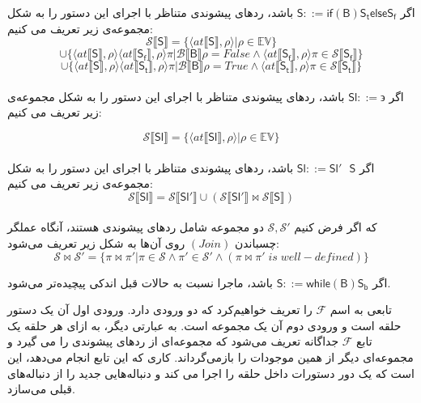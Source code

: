 \begin{defn}
	
	اگر $         \mathsf{S} ::= \mathsf{if}  \mathsf{ (B) S_t else S_f}  $ باشد، ردهای پیشوندی متناظر با اجرای این دستور را به شکل مجموعه‌ی زیر تعریف می کنیم:
	$$\mathcal{S} \llbracket\mathsf{S}\rrbracket = \{ \langle at\llbracket\mathsf{S}\rrbracket , \rho \rangle | \rho \in \mathbb{EV}       \} $$$$\cup     \{ \langle at\llbracket\mathsf{S}\rrbracket , \rho \rangle \langle at\llbracket\mathsf{S_f}\rrbracket , \rho \rangle 
	\pi | \mathcal{B}\llbracket\mathsf{B}\rrbracket \rho =False  \wedge   \langle  at\llbracket\mathsf{S_f}\rrbracket  , \rho \rangle \pi \in \mathcal{S} \llbracket\mathsf{S_f}\rrbracket    \}  
	$$$$\cup    \{ \langle at\llbracket\mathsf{S}\rrbracket , \rho \rangle \langle at\llbracket\mathsf{S_t}\rrbracket , \rho \rangle 
	\pi | \mathcal{B}\llbracket\mathsf{B}\rrbracket \rho =True  \wedge   \langle  at\llbracket\mathsf{S_t}\rrbracket  , \rho \rangle \pi \in \mathcal{S} \llbracket\mathsf{S_t}\rrbracket    \}          $$ \\
	
	
	اگر 
	$         \mathsf{Sl} ::= \backepsilon  $
	باشد، ردهای پیشوندی متناظر با اجرای این دستور را به شکل مجموعه‌ی زیر تعریف می کنیم:
	
	$$\mathcal{S} \llbracket\mathsf{Sl}\rrbracket = \{ \langle at\llbracket\mathsf{Sl}\rrbracket , \rho \rangle | \rho \in \mathbb{EV}       \}        $$ \\
	
	اگر $         \mathsf{Sl} ::= \mathsf{Sl' \:\:\: S}  $ باشد، ردهای پیشوندی متناظر با اجرای این دستور را به شکل مجموعه‌ی زیر تعریف می کنیم:
	$$\mathcal{S} \llbracket\mathsf{Sl}\rrbracket = \mathcal{S} \llbracket\mathsf{Sl'}\rrbracket \cup( \mathcal{S} \llbracket\mathsf{Sl'}\rrbracket
	\Join \mathcal{S} \llbracket\mathsf{S}\rrbracket )      $$ \\
	که اگر فرض کنیم 
	$\mathcal{S,S'}$
	دو مجموعه شامل ردهای پیشوندی هستند، آنگاه عملگر چسباندن 
	$(Join)$
	روی آن‌ها به شکل زیر تعریف می‌شود:
	$$\mathcal{S}\Join \mathcal{S}' = \{\pi \Join \pi' | \pi \in \mathcal{S}\land\pi' \in \mathcal{S}'\land (\pi \Join \pi'\;is\; well-defined) \}$$
	
	
	اگر $         \mathsf{S} ::= \mathsf{while (B)S_b }   $ باشد، ماجرا نسبت به حالات قبل اندکی پیچیده‌تر می‌شود.
	
	 تابعی به اسم $\mathcal{F} $ را تعریف خواهیم‌کرد که دو ورودی دارد. ورودی اول آن یک دستور حلقه است و ورودی دوم آن یک مجموعه است. به عبارتی دیگر، به ازای هر حلقه یک تابع $\mathcal{F} $  جداگانه تعریف می‌شود که مجموعه‌ای از ردهای پیشوندی را می گیرد و مجموعه‌ای دیگر از همین موجودات را بازمی‌گرداند. کاری که این تابع انجام می‌دهد، این است که یک دور دستورات داخل حلقه را اجرا می کند و دنباله‌هایی جدید را از دنباله‌های قبلی می‌سازد. 
	 

\end{defn}
